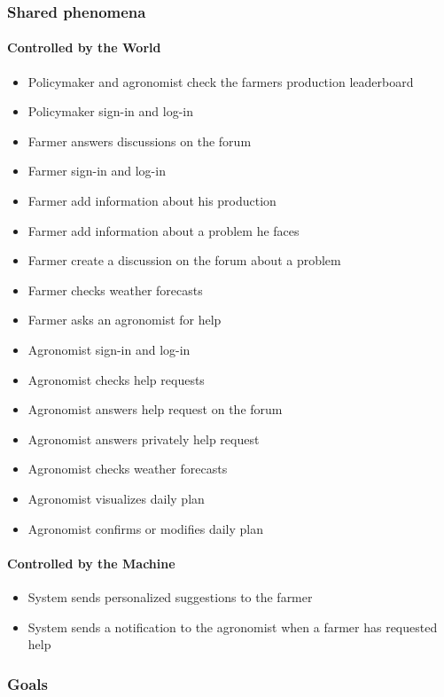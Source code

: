 \subsubsection{Shared phenomena}
\paragraph{Controlled by the World}
\begin{itemize}
    \item Policymaker and agronomist check the farmers production leaderboard
    \item Policymaker sign-in and log-in
    \item Farmer answers discussions on the forum
    \item Farmer sign-in and log-in 
    \item Farmer add information about his production
    \item Farmer add information about a problem he faces
    \item Farmer create a discussion on the forum about a problem
    \item Farmer checks weather forecasts
    \item Farmer asks an agronomist for help
    \item Agronomist sign-in and log-in
    \item Agronomist checks help requests
    \item Agronomist answers help request on the forum
    \item Agronomist answers privately help request
    \item Agronomist checks weather forecasts
    \item Agronomist visualizes daily plan
    \item Agronomist confirms or modifies daily plan
\end{itemize}

\paragraph{Controlled by the Machine}
\begin{itemize}
    \item System sends personalized suggestions to the farmer
    \item System sends a notification to the agronomist when a farmer has requested help
\end{itemize}

\subsubsection{Goals}

